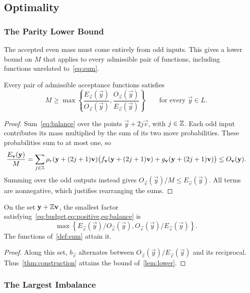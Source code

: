 \subsection{Optimality}
\label{sec:optimality}

\subsubsection{The Parity Lower Bound}

The accepted even mass must come entirely from odd inputs. This gives a lower bound on $M$ that applies to every admissible pair of functions, including functions unrelated to~\cref{eq:sum}.

\begin{lemma}
\label{lem:lower}
Every pair of admissible acceptance functions satisfies
\[
 M\ge\max\!\left\{\frac{E_{\vec v}(\vec y)}{O_{\vec v}(\vec y)},\frac{O_{\vec v}(\vec y)}{E_{\vec v}(\vec y)}\right\}
 \qquad\text{for every }\vec y\in L.
\]
\end{lemma}
\begin{proof}
Sum~\cref{eq:balance} over the points $\vec y+2j\vec v$, with $j\in\mathbb{Z}$. Each odd input contributes its mass multiplied by the sum of its two move probabilities. These probabilities sum to at most one, so
\[
 \frac{E_{\mathbf{v}}(\mathbf{y})}M
 =\sum_{j\in\mathbb{Z}}\rho_r(\mathbf{y}+(2j+1)\mathbf{v})
 \bigl(f_{\mathbf{v}}(\mathbf{y}+(2j+1)\mathbf{v})+g_{\mathbf{v}}(\mathbf{y}+(2j+1)\mathbf{v})\bigr)
 \le O_{\mathbf{v}}(\mathbf{y}).
\]
Summing over the odd outputs instead gives $O_{\vec v}(\vec y)/M\le E_{\vec v}(\vec y)$. All terms are nonnegative, which justifies rearranging the sums.
\end{proof}

\begin{corollary}
\label{cor:line}
On the set $\mathbf{y}+\mathbb{Z}\mathbf{v}$, the smallest factor satisfying~\cref{eq:budget,eq:positive,eq:balance} is
\[
 \max\!\left\{E_{\vec v}(\vec y)/O_{\vec v}(\vec y),O_{\vec v}(\vec y)/E_{\vec v}(\vec y)\right\}.
\]
The functions of~\cref{def:sum} attain it.
\end{corollary}
\begin{proof}
Along this set, $b_{\vec v}$ alternates between $O_{\vec v}(\vec y)/E_{\vec v}(\vec y)$ and its reciprocal. Thus~\cref{thm:construction} attains the bound of~\cref{lem:lower}.
\end{proof}

\subsubsection{The Largest Imbalance}

